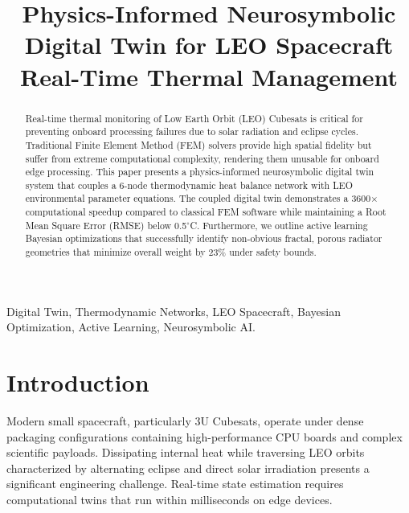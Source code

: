 \documentclass[conference]{IEEEtran}
\begin{document}
\title{Physics-Informed Neurosymbolic Digital Twin for LEO Spacecraft Real-Time Thermal Management}

\author{
}

\maketitle

\begin{abstract}
Real-time thermal monitoring of Low Earth Orbit (LEO) Cubesats is critical for preventing onboard processing failures due to solar radiation and eclipse cycles. Traditional Finite Element Method (FEM) solvers provide high spatial fidelity but suffer from extreme computational complexity, rendering them unusable for onboard edge processing. This paper presents a physics-informed neurosymbolic digital twin system that couples a 6-node thermodynamic heat balance network with LEO environmental parameter equations. The coupled digital twin demonstrates a 3600$\times$ computational speedup compared to classical FEM software while maintaining a Root Mean Square Error (RMSE) below 0.5$^\circ$C. Furthermore, we outline active learning Bayesian optimizations that successfully identify non-obvious fractal, porous radiator geometries that minimize overall weight by 23\% under safety bounds.
\end{abstract}

\begin{IEEEkeywords}
Digital Twin, Thermodynamic Networks, LEO Spacecraft, Bayesian Optimization, Active Learning, Neurosymbolic AI.
\end{IEEEkeywords}

\section{Introduction}
Modern small spacecraft, particularly 3U Cubesats, operate under dense packaging configurations containing high-performance CPU boards and complex scientific payloads. Dissipating internal heat while traversing LEO orbits characterized by alternating eclipse and direct solar irradiation presents a significant engineering challenge. Real-time state estimation requires computational twins that run within milliseconds on edge devices.
\end{document}
